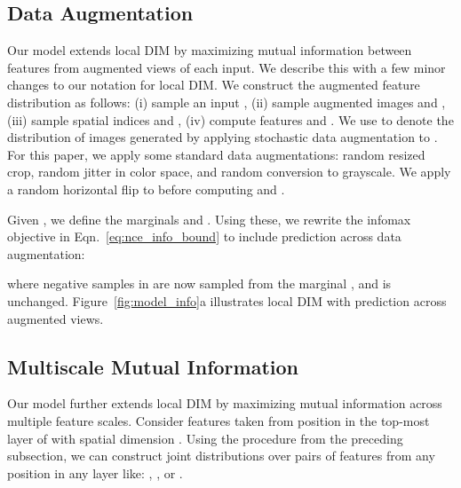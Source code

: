\documentclass{article}
\begin{document}
\begin{figure*}[t!]
    \centering
    \quad
    \quad
    \caption{\textbf{(a)}: Local DIM with predictions across views generated by data augmentation. \textbf{(b)}: Augmented Multiscale DIM, with multiscale infomax across views generated by data augmentation. \textbf{(c)}-top: An algorithm for efficient NCE with minibatches of  images, comprising one antecedent and  consequents per image. For each true (antecedent, consequent) positive sample pair, we compute the NCE bound using all consequents associated with all other antecedents as negative samples. Our pseudo-code is roughly based on pytorch. We use dynamic programming in the log-softmax normalizations required by . \textbf{(c)}-bottom: Our ImageNet encoder architecture.}
    \label{fig:model_info}
    \vspace{-0.5cm}
\end{figure*}

\subsection{Data Augmentation}
\label{sec:dim_with_aug}
Our model extends local DIM by maximizing mutual information between features from augmented views of each input. We describe this with a few minor changes to our notation for local DIM.
We construct the augmented feature distribution  as follows: (i) sample an input , (ii) sample augmented images  and , (iii) sample spatial indices  and , (iv) compute features  and .
We use  to denote the distribution of images generated by applying stochastic data augmentation to .
For this paper, we apply some standard data augmentations: random resized crop, random jitter in color space, and random conversion to grayscale.
We apply a random horizontal flip to  before computing  and .

Given , we define the marginals  and .
Using these, we rewrite the infomax objective in Eqn.~\ref{eq:nce_info_bound} to include prediction across data augmentation:

where negative samples in  are now sampled from the marginal , and  is unchanged. Figure~\ref{fig:model_info}a illustrates local DIM with prediction across augmented views.

\subsection{Multiscale Mutual Information}
Our model further extends local DIM by maximizing mutual information across multiple feature scales.
Consider features  taken from position  in the top-most layer of  with spatial dimension .
Using the procedure from the preceding subsection, we can construct joint distributions over pairs of features from any position in any layer like: , , or .
\end{document}
